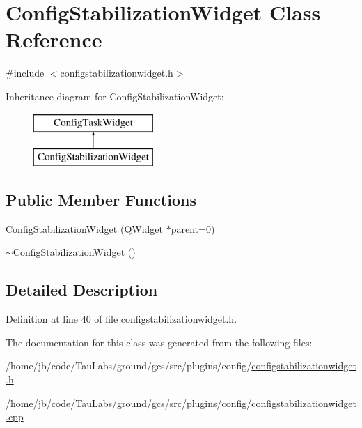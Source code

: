 \hypertarget{class_config_stabilization_widget}{\section{\-Config\-Stabilization\-Widget \-Class \-Reference}
\label{class_config_stabilization_widget}
}


{\ttfamily \#include $<$configstabilizationwidget.\-h$>$}

\-Inheritance diagram for \-Config\-Stabilization\-Widget\-:\begin{figure}[H]
\begin{center}
\leavevmode
\includegraphics[height=2.000000cm]{class_config_stabilization_widget}
\end{center}
\end{figure}
\subsection*{\-Public \-Member \-Functions}
\begin{DoxyCompactItemize}
\item 
\hyperlink{group___config_plugin_ga7ede076de26384e87d8b8357b391c0b6}{\-Config\-Stabilization\-Widget} (\-Q\-Widget $\ast$parent=0)
\item 
\hyperlink{group___config_plugin_gaeca64ce80c3529dc40b452e3bcef2ffd}{$\sim$\-Config\-Stabilization\-Widget} ()
\end{DoxyCompactItemize}


\subsection{\-Detailed \-Description}


\-Definition at line 40 of file configstabilizationwidget.\-h.



\-The documentation for this class was generated from the following files\-:\begin{DoxyCompactItemize}
\item 
/home/jb/code/\-Tau\-Labs/ground/gcs/src/plugins/config/\hyperlink{configstabilizationwidget_8h}{configstabilizationwidget.\-h}\item 
/home/jb/code/\-Tau\-Labs/ground/gcs/src/plugins/config/\hyperlink{configstabilizationwidget_8cpp}{configstabilizationwidget.\-cpp}\end{DoxyCompactItemize}
